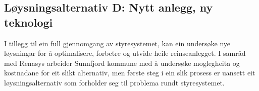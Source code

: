 \newpage
\subsection{Løysningsalternativ D: Nytt anlegg, ny teknologi}
I tillegg til ein full gjennomgang av styresystemet, 
kan ein undersøke nye løysningar for å optimalisere, forbetre og utvide heile reinseanlegget.
I samråd med Renasys arbeider Sunnfjord kommune med å undersøke moglegheita og kostnadane for eit slikt alternativ,
men første steg i ein slik prosess er uansett eit løysningsalternativ som forholder seg til problema rundt styresystemet.
